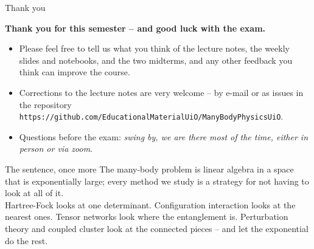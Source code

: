 \documentclass[aspectratio=169,10pt]{beamer}
\begin{document}
\begin{frame}[shrink=3]{Thank you}
\begin{center}
{\Large\bfseries\color{uioblue} Thank you for this semester -- and good luck with the exam.}
\end{center}
\vspace{0.8em}
\begin{itemize}
\item Please feel free to tell us what you think of the lecture notes, the weekly slides and notebooks, and the two midterms, and any other feedback you think can improve the course.
\item Corrections to the lecture notes are very welcome -- by e-mail or as issues in the repository \texttt{https://github.com/EducationalMaterialUiO/ManyBodyPhysicsUiO}.
\item Questions before the exam: {\em swing by, we are there most of the time, either in person or via zoom}.
\end{itemize}
\vspace{0.6em}
\begin{exampleblock}{The sentence, once more}
The many-body problem is linear algebra in a space that is exponentially large; every method we study is a strategy for not having to look at all of it.\\[0.3em]
\small Hartree-Fock looks at one determinant. Configuration interaction looks at the nearest ones. Tensor networks look where the entanglement is. Perturbation theory and coupled cluster look at the connected pieces -- and let the exponential do the rest.
\end{exampleblock}
\end{frame}
\end{document}
